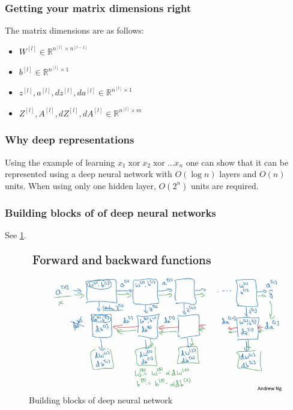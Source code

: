 \documentclass{article}
\begin{document}
\subsubsection{Getting your matrix dimensions right}
The matrix dimensions are as follows:
\begin{itemize}
  \item $W^{[l]}\in\mathbb{R}^{n^{[l]}\times n^{[l-1]}}$
  \item $b^{[l]}\in\mathbb{R}^{n^{[l]}\times 1}$
  \item $z^{[l]},a^{[l]},dz^{[l]},da^{[l]}\in\mathbb{R}^{n^{[l]}\times 1}$
  \item $Z^{[l]},A^{[l]},dZ^{[l]},dA^{[l]}\in\mathbb{R}^{n^{[l]}\times m}$
\end{itemize}

\subsubsection{Why deep representations}
Using the example of learning $x_1\operatorname{xor}x_2\operatorname{xor}\ldots x_n$ one can show that
it can be represented using a deep neural network with $O(\log n)$ layers and $O(n)$ units.
When using only one hidden layer, $O(2^n)$ units are required.

\subsubsection{Building blocks of of deep neural networks}
See \cref{fig:deepblocks}.
\begin{figure}[htbp]
  \begin{center}
    \includegraphics[width=\textwidth]{deepblocks}
    \caption{Building blocks of deep neural network}
    \label{fig:deepblocks}
  \end{center}
\end{figure}
\end{document}
